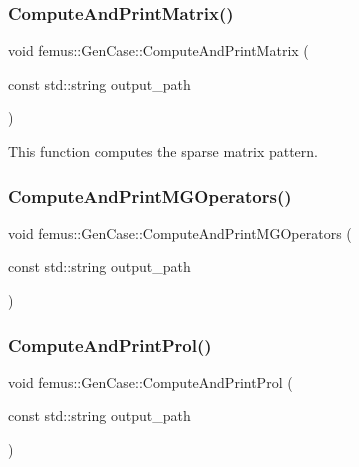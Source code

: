 \subsubsection{\texorpdfstring{Compute\+And\+Print\+Matrix()}{ComputeAndPrintMatrix()}}
{\footnotesize\ttfamily void femus\+::\+Gen\+Case\+::\+Compute\+And\+Print\+Matrix (\begin{DoxyParamCaption}\item[{const std\+::string}]{output\+\_\+path }\end{DoxyParamCaption})}



This function computes the sparse matrix pattern. 

\mbox{\label{classfemus_1_1_gen_case_a7638dda7e28540362e134cd783ac2826}} 
\subsubsection{\texorpdfstring{Compute\+And\+Print\+M\+G\+Operators()}{ComputeAndPrintMGOperators()}}
{\footnotesize\ttfamily void femus\+::\+Gen\+Case\+::\+Compute\+And\+Print\+M\+G\+Operators (\begin{DoxyParamCaption}\item[{const std\+::string}]{output\+\_\+path }\end{DoxyParamCaption})}

\mbox{\label{classfemus_1_1_gen_case_acf6276fa8c123a0911b1cde3975b01e1}} 
\subsubsection{\texorpdfstring{Compute\+And\+Print\+Prol()}{ComputeAndPrintProl()}}
{\footnotesize\ttfamily void femus\+::\+Gen\+Case\+::\+Compute\+And\+Print\+Prol (\begin{DoxyParamCaption}\item[{const std\+::string}]{output\+\_\+path }\end{DoxyParamCaption})}

